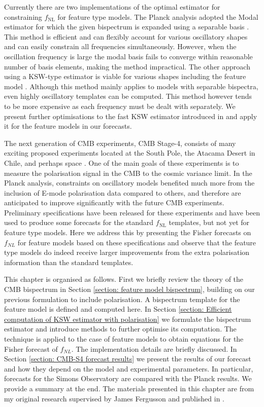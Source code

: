 Currently there are two implementations of the optimal estimator for constraining $f_\text{NL}$ for feature type models. The Planck analysis adopted the Modal estimator for which the given bispectrum is expanded using a separable basis \cite{Fergusson2012,Fergusson2014}. This method is efficient and can flexibly account for various oscillatory shapes and can easily constrain all frequencies simultaneously. However, when the oscillation frequency is large the modal basis fails to converge within reasonable number of basis elements, making the method impractical. The other approach using a KSW-type estimator is viable for various shapes including the feature model \cite{Komatsu2005,Munchmeyer2014}. Although this method mainly applies to models with separable bispectra, even highly oscillatory templates can be computed.  This method however tends to be more expensive as each frequency must be dealt with separately. We present further optimisations to the fast KSW estimator introduced in \cite{Yadav2007} and apply it for the feature models in our forecasts.

The next generation of CMB experiments, CMB Stage-4, consists of many exciting proposed experiments located at the South Pole, the Atacama Desert in Chile, and perhaps space \cite{Abazajian2016,TheSimonsObservatoryCollaboration2018,TheCOrEcollaboration2015}. One of the main goals of these experiments is to measure the polarisation signal in the CMB to the cosmic variance limit. In the Planck analysis, constraints on oscillatory models benefited much more from the inclusion of E-mode polarisation data compared to others, and therefore are anticipated to improve significantly with the future CMB experiments. Preliminary specifications have been released for these experiments \cite{Abazajian2016,TheSimonsObservatoryCollaboration2018} and have been used to produce some forecasts for the standard $f_\text{NL}$ templates, but not yet for feature type models. Here we address this by presenting the Fisher forecasts on $f_{NL}$ for feature models based on these specifications and observe that the feature type models do indeed receive larger improvements from the extra polarisation information than the standard templates.

This chapter is organised as follows. First we briefly review the theory of the CMB bispectrum in Section \ref{section: feature model bispectrum}, building on our previous formulation to include polarisation. A bispectrum template for the feature model is defined and computed here. In Section \ref{section: Efficient computation of KSW estimator with polarisation} we formulate the bispectrum estimator and introduce methods to further optimise its computation. The technique is applied to the case of feature models to obtain equations for the Fisher forecast of $f_{NL}$. The implementation details are briefly discussed. In Section \ref{section: CMB-S4 forecast results} we present the results of our forecast and how they depend on the model and experimental parameters. In particular, forecasts for the Simons Observatory are compared with the Planck results. We provide a summary at the end. The materials presented in this chapter are from my original research supervised by James Fergusson and published in \cite{Sohn2019}.


